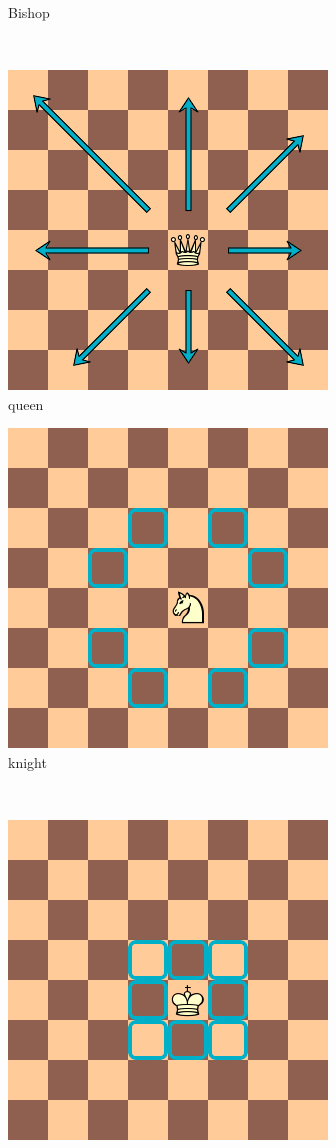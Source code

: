 \begin{figure}
\begin{subfigure}[b]{0.4\textwidth}
        \caption{Bishop}
        \label{fig:bishop}
    \end{subfigure}
    \\
    \begin{subfigure}[b]{0.4\textwidth}
        \includegraphics[scale=0.5]{fig/rules/queen}
        \caption{queen}
        \label{fig:queen}
    \end{subfigure}
    \qquad
    \begin{subfigure}[b]{0.4\textwidth}
         \includegraphics[scale=0.5]{fig/rules/knight}
        \caption{knight}
        \label{fig:knight}
    \end{subfigure}
    \\
    \begin{subfigure}[b]{0.4\textwidth}
            \includegraphics[scale=0.5]{fig/rules/king}

\end{subfigure}
\end{figure}
